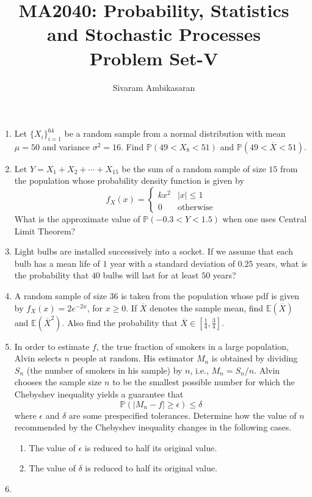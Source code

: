 \documentclass{article}
\title{MA2040: Probability, Statistics and Stochastic Processes\\
Problem Set-V}
\author{Sivaram Ambikasaran}
\newcommand{\abs}[1]{\displaystyle\left\lvert#1\right\rvert}
\newcommand{\Pb}{\mathbb{P}}
\newcommand{\Eb}{\mathbb{E}}
\newcommand{\bkt}[1]{\left(#1\right)}
\begin{document}
	\maketitle
	\begin{enumerate}
		\item
		Let $\{X_i\}_{i=1}^{64}$ be a random sample from a normal distribution with mean $\mu = 50$ and variance $\sigma^2=16$. Find $\Pb\bkt{49 < X_8 < 51}$ and $\Pb\bkt{49 < \overline{X} < 51}$.
		\item
		Let $Y = X_1+X_2+\cdots+X_15$ be the sum of a random sample of size $15$ from the population whose probability density function is given by
		$$f_X(x) = \begin{cases}
		kx^2 & \abs{x} \leq 1\\
		0 & \text{otherwise}
		\end{cases}$$
		What is the approximate value of $\Pb\bkt{-0.3<Y<1.5}$ when one uses Central Limit Theorem?
		\item
		Light bulbs are installed successively into a socket. If we assume that each bulb has a mean life of $1$ year with a standard deviation of $0.25$ years, what is the probability that $40$ bulbs will last for at least $50$ years?
		\item
		A random sample of size $36$ is taken from the population whose pdf is given by $f_X(x) = 2e^{-2x}$, for $x \geq 0$. If $\overline{X}$ denotes the sample mean, find $\Eb\bkt{\overline{X}}$ and $\Eb\bkt{\overline{X}^2}$. Also find the probability that $\overline{X} \in \left[\frac14,\frac34\right]$.
		\item
		In order to estimate $f$, the true fraction of smokers in a large population, Alvin selects $n$ people at random. His estimator $M_n$ is obtained by dividing $S_n$ (the number of smokers in his sample) by $n$, i.e., $M_n=S_n/n$. Alvin chooses the sample size $n$ to be the smallest possible number for which the Chebyshev inequality yields a guarantee that 
		$$\Pb \bkt{\abs{M_n-f} \geq \epsilon} \leq \delta$$
		where $\epsilon$ and $\delta$ are some prespecified tolerances. Determine how the value of $n$ recommended by the Chebyshev inequality changes in the following cases.
		\begin{enumerate}
			\item
			The value of $\epsilon$ is reduced to half its original value.
			\item
			The value of $\delta$ is reduced to half its original value.
		\end{enumerate}
		\item

\end{enumerate}
\end{document}
